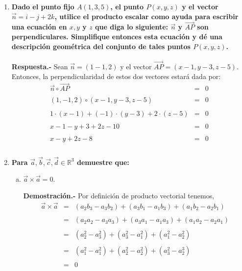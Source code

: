 \begin{enumerate}
\item \textbf{ \boldmath Dado el punto fijo $A(1, 3, 5)$, el punto $P(x, y, z)$ y el vector $\vec{n} = i - j + 2k$, utilice el producto escalar como ayuda para escribir una ecuación en $x, y$ y $z$ que diga lo siguiente: $\vec{n}$ y $\vec{AP}$ son perpendiculares. Simplifique entonces esta ecuación y dé una descripción geométrica del conjunto de tales puntos $P(x, y, z)$.\\\\
    Respuesta.-}\; Sean $\vec{n}=(1-1,2)$ y el vector $\vec{AP}=(x-1,y-3,z-5)$. Entonces, la perpendicularidad de estos dos vectores estará dada por:
    $$\begin{array}{rcl}
	\vec{n}\circ \vec{AP}&=&0\\\\
	(1,-1,2)\circ (x-1,y-3,z-5)&=&0\\\\
	1\cdot(x-1)+(-1)\cdot(y-3)+2\cdot(z-5)&=&0\\\\
	x-1-y+3+2z-10&=&0\\\\
	x-y+2z-8&=&0\\\\
    \end{array}$$
    \vspace{.4cm}


\item \textbf{Para \boldmath $\vec{a},\vec{b},\vec{c},\vec{d}\in \mathbb{R}^3$ demuestre que:}

	\begin{enumerate}[a)]

	    \item \textbf{\boldmath $\vec{a}\times \vec{a}=0.$\\\\
		Demostración.-}\; Por definición de producto vectorial tenemos,
		$$\begin{array}{rcl}
		    \vec{a}\times \vec{a}&=&\left(a_2b_3-a_3b_2\right)+\left(a_3b_1-a_1b_3\right)+\left(a_1b_2-a_2b_1\right)\\\\
		    &=&\left(a_2a_2-a_3a_3\right)+\left(a_3a_1-a_1a_3\right)+\left(a_1a_2-a_2a_1\right)\\\\
		    &=&\left(a_2^2-a_3^2\right)+\left(a_3^2-a_1^2\right)+\left(a_1^2-a_2^2\right)\\\\
		    &=&\left(a_1^2-a_1^2\right)+\left(a_2^2-a_2^2\right)+\left(a_3^2-a_2^3\right)\\\\
		    &=&0\\
		\end{array}$$
		\vspace{.4cm}


\end{enumerate}
\end{enumerate}
